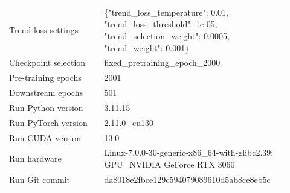 \begin{table}[p]
\begin{tabular}{p{0.32\linewidth}p{0.60\linewidth}}
Trend-loss settings & \{"trend\_loss\_temperature": 0.01, "trend\_loss\_threshold": 1e-05, "trend\_selection\_weight": 0.0005, "trend\_weight": 0.001\} \\
Checkpoint selection & fixed\_pretraining\_epoch\_2000 \\
Pre-training epochs & 2001 \\
Downstream epochs & 501 \\
Run Python version & 3.11.15 \\
Run PyTorch version & 2.11.0+cu130 \\
Run CUDA version & 13.0 \\
Run hardware & Linux-7.0.0-30-generic-x86\_64-with-glibc2.39; GPU=NVIDIA GeForce RTX 3060 \\
Run Git commit & da8018e2fbce129c594079089610d5ab8ce8eb5c \\
\bottomrule
\end{tabular}
\end{table}
